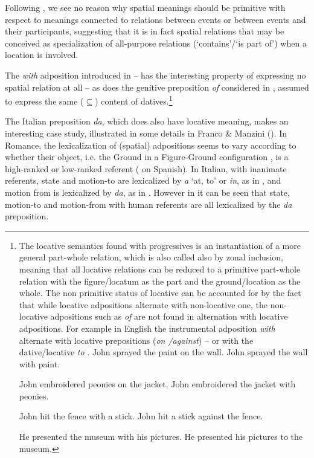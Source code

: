 \documentclass[output=paper,modfonts,nonflat,newtxmath,colorlinks,citecolor=brown]{langsci/langscibook}
\begin{document}
Following \citet{ManziniSavoia2011, FrancoManzini2017Gen, FrancoManzini2017Ins}, we see no reason why spatial meanings should be primitive with respect to meanings connected to relations between events or between events and their participants, suggesting that it is in fact spatial relations that may be conceived as specialization of all-purpose relations (‘contains’/‘is part of’) when a location is involved.

The \textit{with} adposition introduced in -- has the interesting property of expressing no spatial relation at all \citep{Levinson2011} – as does the genitive preposition \textit{of} considered in , assumed to express the same (${\subseteq}$) content of datives.\footnote{The locative semantics found with progressives is an instantiation of a more general part-whole relation, which is also called also by \citet[170]{BelvindenDikken1997} {zonal inclusion}, meaning that all locative relations can be reduced to a primitive part-whole relation with the {figure/locatum} as the {part} and the {ground/location} as the {whole}. The non primitive status of locative can be accounted for by the fact that while locative adpositions alternate with non-locative one, the non-locative adpositions such as \textit{of} are not found in alternation with locative adpositions. For example in English the instrumental adposition \textit{with} alternate with locative prepositions (\textit{on /against}) -- or with the dative/locative \textit{to} .
\ea %
    \label{ex:franco:i}
    \ea John sprayed the paint on the wall.
    \ex John sprayed the wall with paint.
    \z
    \z

\ea %
    \label{ex:franco:ii}
    \ea John embroidered peonies on the jacket.
    \ex John embroidered the jacket with peonies.
    \z
    \z

\ea %
    \label{ex:franco:iii}
    \ea John hit the fence with a stick.
    \ex John hit a stick against the fence.
    \z
    \z

\ea %
    \label{ex:franco:iv}
    \ea He presented the museum with his pictures.
    \ex He presented his pictures to the museum.
    \z
    \z

}

The Italian preposition \textit{da}, which does also have locative meaning, makes an interesting case study, illustrated in some details in Franco \& Manzini (\citeyear{FrancoManzini2017Gen, FrancoManzini2017Ins}). In Romance, the lexicalization of (spatial) adpositions seems to vary according to whether their object, i.e. the Ground in a Figure-Ground configuration \citep{Svenonius2006axial}, is a high-ranked or low-ranked referent (\citealt{Fabregas2015direccionales} on Spanish). In Italian, with inanimate referents, state and motion-to are lexicalized by \textit{a} ‘at, to’ or \textit{in}, as in , and motion from is lexicalized by \textit{da}, as in . However in  it can be seen that state, motion-to and motion-from with human referents are all lexicalized by the \textit{da} preposition.
\end{document}
